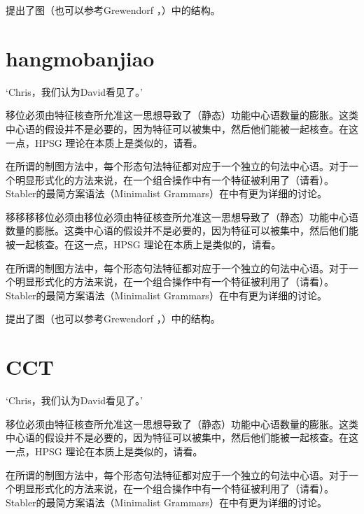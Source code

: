 \documentclass{scrbook}
\let\citew\citealp
\newcommand{\page}{}
\begin{document}
\citet[\page 297]{Rizzi97a-u}提出了图（也可以参考Grewendorf \citeyear[\page 85, 240]{Grewendorf2002a}，\citeyear{Grewendorf2009a}）中的结构。

\section{hangmobanjiao}


    `Chris，我们认为David看见了。'

移位必须由特征核查所允准这一思想导致了（静态）功能中心语数量的膨胀。这类中心语的假设并不是必要的，因为特征可以被集中，然后他们能被一起核查。在这一点，HPSG 理论在本质上是类似的，请看\citew[\S~II.3.3.4, \S~II.4.2]{Sternefeld2006a-u}。

在所谓的制图方法中，每个形态句法特征都对应于一个独立的句法中心语\citep[\page 54, 61]{CR2010a}。对于一个明显形式化的方法来说，在一个组合操作中有一个特征被利用了（请看\citew[\page 335]{Stabler2001a}）。Stabler的最简方案语法（Minimalist Grammars）在中有更为详细的讨论。

移移移移位必须由移位必须由特征核查所允准这一思想导致了（静态）功能中心语数量的膨胀。这类中心语的假设并不是必要的，因为特征可以被集中，然后他们能被一起核查。在这一点，HPSG 理论在本质上是类似的，请看\citew[\S~II.3.3.4, \S~II.4.2]{Sternefeld2006a-u}。

在所谓的制图方法中，每个形态句法特征都对应于一个独立的句法中心语\citep[\page 54, 61]{CR2010a}。对于一个明显形式化的方法来说，在一个组合操作中有一个特征被利用了（请看\citew[\page 335]{Stabler2001a}）。Stabler的最简方案语法（Minimalist Grammars）在中有更为详细的讨论。

\citet[\page 297]{Rizzi97a-u}提出了图（也可以参考Grewendorf \citeyear[\page 85, 240]{Grewendorf2002a}，\citeyear{Grewendorf2009a}）中的结构。

\section{CCT}

    `Chris，我们认为David看见了。'

移位必须由特征核查所允准这一思想导致了（静态）功能中心语数量的膨胀。这类中心语的假设并不是必要的，因为特征可以被集中，然后他们能被一起核查。在这一点，HPSG 理论在本质上是类似的，请看\citew[\S~II.3.3.4, \S~II.4.2]{Sternefeld2006a-u}。

在所谓的制图方法中，每个形态句法特征都对应于一个独立的句法中心语\citep[\page 54, 61]{CR2010a}。对于一个明显形式化的方法来说，在一个组合操作中有一个特征被利用了（请看\citew[\page 335]{Stabler2001a}）。Stabler的最简方案语法（Minimalist Grammars）在中有更为详细的讨论。
\end{document}
